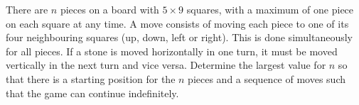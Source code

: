 There are $n$ pieces on a board with $5 \times 9$ squares,
with a maximum of one piece on each square at any time.
A move consists of moving each piece to one of its four neighbouring squares (up, down, left or right).
This is done simultaneously for all pieces. If a stone is moved horizontally in one turn,
it must be moved vertically in the next turn and vice versa.
Determine the largest value for $n$ so that there is a starting position for the $n$ pieces
and a sequence of moves such that the game can continue indefinitely.